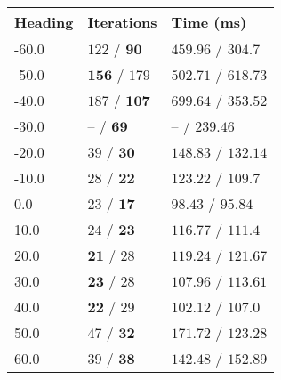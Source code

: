 \begin{tabular}{lll}
\toprule 
Heading & Iterations & Time (ms) \\
\midrule 
-60.0 & $122$ / $\mathbf{90}$ & $459.96$ / $\mathbf{304.7}$ \\
-50.0 & $\mathbf{156}$ / $179$ & $\mathbf{502.71}$ / $618.73$ \\
-40.0 & $187$ / $\mathbf{107}$ & $699.64$ / $\mathbf{353.52}$ \\
-30.0 & -- / $\mathbf{69}$ & -- / $\mathbf{239.46}$ \\
-20.0 & $39$ / $\mathbf{30}$ & $148.83$ / $\mathbf{132.14}$ \\
-10.0 & $28$ / $\mathbf{22}$ & $123.22$ / $\mathbf{109.7}$ \\
0.0 & $23$ / $\mathbf{17}$ & $98.43$ / $\mathbf{95.84}$ \\
10.0 & $24$ / $\mathbf{23}$ & $116.77$ / $\mathbf{111.4}$ \\
20.0 & $\mathbf{21}$ / $28$ & $\mathbf{119.24}$ / $121.67$ \\
30.0 & $\mathbf{23}$ / $28$ & $\mathbf{107.96}$ / $113.61$ \\
40.0 & $\mathbf{22}$ / $29$ & $\mathbf{102.12}$ / $107.0$ \\
50.0 & $47$ / $\mathbf{32}$ & $171.72$ / $\mathbf{123.28}$ \\
60.0 & $39$ / $\mathbf{38}$ & $\mathbf{142.48}$ / $152.89$ \\
\bottomrule 
\end{tabular}

